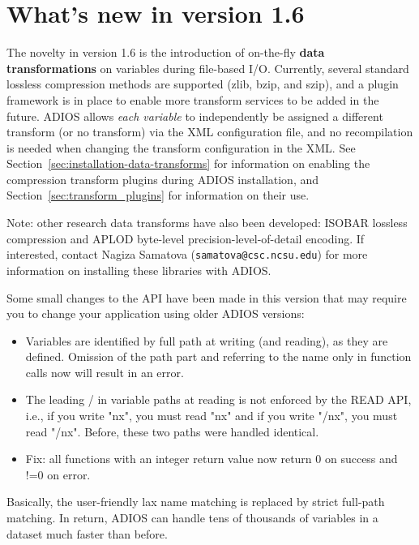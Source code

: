 \section {What's new in version 1.6}
The novelty in version 1.6 is the introduction
of on-the-fly {\bf data transformations} on variables during file-based I/O.
Currently, several standard lossless compression methods are supported (zlib, bzip, and szip),
and a plugin framework is in place to enable more transform services to be added in the future.
ADIOS allows \emph{each variable} to independently be assigned a different transform
(or no transform) via the XML configuration file, and no recompilation is needed
when changing the transform configuration in the XML. See
Section~\ref{sec:installation-data-transforms} for information on enabling the compression
transform plugins during ADIOS installation, and Section~\ref{sec:transform_plugins}
for information on their use.

Note: other research data transforms have also been developed: ISOBAR lossless compression and
APLOD byte-level precision-level-of-detail encoding. If interested, contact
Nagiza Samatova (\verb+samatova@csc.ncsu.edu+) for more information
on installing these libraries with ADIOS.

\vspace{10pt}

\noindent Some small changes to the API have been made in this version that may require you to change your application using older ADIOS versions:
\begin{itemize}
\item Variables are identified by full path at writing (and reading), as they are defined. Omission of the path part and referring to the name only in function calls now will result in an error.
\item The leading / in variable paths at reading is not enforced by the READ API, i.e., if you write "nx", you must read "nx" and if you write "/nx", you must read "/nx". Before, these two paths were handled identical.
\item Fix: all functions with an integer return value now return 0 on success and !=0 on error.
\end{itemize}

Basically, the user-friendly lax name matching is replaced by strict full-path matching. In return, ADIOS can handle tens of thousands of variables in a dataset much faster than before.

\vspace{10pt}

